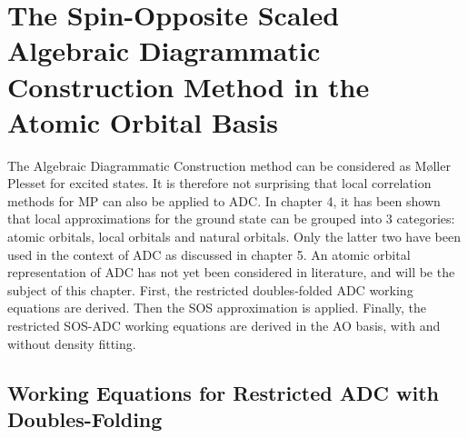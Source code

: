 \chapter{The Spin-Opposite Scaled Algebraic Diagrammatic Construction Method in the Atomic Orbital Basis \label{cha:AOADC}}

The Algebraic Diagrammatic Construction method can be considered as M{\o}ller Plesset for excited states. It is therefore not surprising that local correlation methods for MP can also be applied to ADC. In chapter 4, it has been shown that local approximations for the ground state can be grouped into 3 categories: atomic orbitals, local orbitals and natural orbitals. Only the latter two have been used in the context of ADC as discussed in chapter 5. An atomic orbital representation of ADC has not yet been considered in literature, and will be the subject of this chapter. First, the restricted doubles-folded ADC working equations are derived. Then the SOS approximation is applied. Finally, the restricted SOS-ADC working equations are derived in the AO basis, with and without density fitting. 

\section{Working Equations for Restricted ADC with Doubles-Folding}

